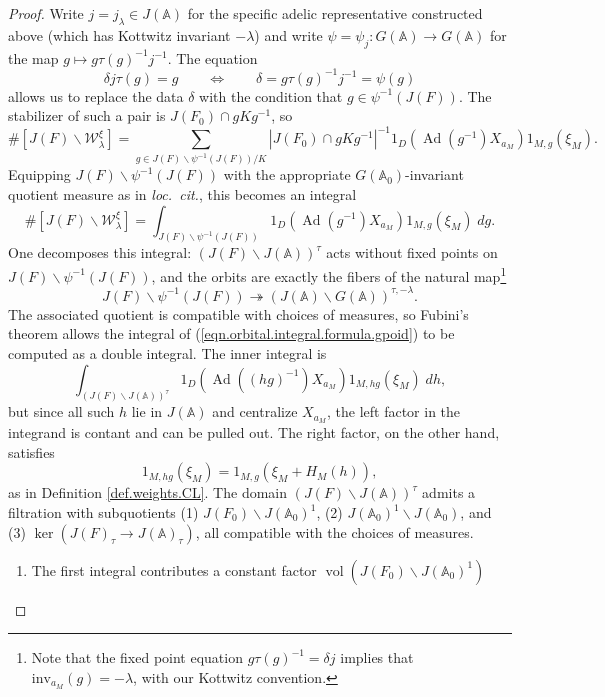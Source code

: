 \documentclass[openany]{amsbook}
\theoremstyle{definition}
\theoremstyle{remark}
\numberwithin{equation}{section}
\newcommand{\A}{\mathbb{A}}
\newcommand{\vol}{\operatorname{vol}}
\renewcommand{\-}{\operatorname{-}}
\newcommand{\on}[1]{\operatorname{#1}}
\renewcommand{\A}{\mathbb{A}}
\newcommand{\Ad}{\on{Ad}}
\newcommand{\inv}{\mathrm{inv}}
\begin{document}
\begin{proof}
    Write $j = j_\lambda \in J(\A)$ for the specific adelic representative constructed above (which has Kottwitz invariant $-\lambda$) and write $\psi = \psi_j: G(\A) \to G(\A)$ for the map $g \mapsto g \tau(g)^{-1} j^{-1}$. The equation 
    $$
        \delta j \tau(g) = g \qquad \Longleftrightarrow \qquad \delta = g \tau(g)^{-1} j^{-1} = \psi(g)
    $$
    allows us to replace the data $\delta$ with the condition that $g \in \psi^{-1}(J(F))$. The stabilizer of such a pair is $J(F_0) \cap g K g^{-1}$, so 
    $$
        \# [J(F) \backslash \mathcal{W}^\xi_\lambda] = \sum_{g \in J(F) \backslash \psi^{-1}(J(F)) / K} |J(F_0) \cap g K g^{-1}|^{-1} 1_D(\Ad(g^{-1}) X_{a_M}) 1_{M,g}(\xi_M).
    $$
    Equipping $J(F)\backslash \psi^{-1}(J(F))$ with the appropriate $G(\A_0)$-invariant quotient measure as in \textit{loc.\ cit.}, this becomes an integral
    \begin{equation}\label{eqn.orbital.integral.formula.gpoid}
        \# [J(F) \backslash \mathcal{W}^\xi_\lambda] = \int_{J(F) \backslash \psi^{-1}(J(F))} 1_D(\Ad(g^{-1}) X_{a_M}) 1_{M,g}(\xi_M) \; dg.
    \end{equation}
    One decomposes this integral: $(J(F) \backslash J(\A))^\tau$ acts without fixed points on $J(F) \backslash \psi^{-1}(J(F))$, and the orbits are exactly the fibers of the natural map\footnote{Note that the fixed point equation $g \tau(g)^{-1} = \delta j$ implies that $\inv_{a_M}(g) = -\lambda$, with our Kottwitz convention.}
    $$
        J(F) \backslash \psi^{-1}(J(F)) \twoheadrightarrow (J(\A) \backslash G(\A))^{\tau, -\lambda}.
    $$
    The associated quotient is compatible with choices of measures, so Fubini's theorem allows the integral of (\ref{eqn.orbital.integral.formula.gpoid}) to be computed as a double integral. The inner integral is
    $$
        \int_{(J(F) \backslash J(\A))^\tau} 1_D(\Ad((hg)^{-1}) X_{a_M}) 1_{M,hg}(\xi_M) \; dh,
    $$
    but since all such $h$ lie in $J(\A)$ and centralize $X_{a_M}$, the left factor in the integrand is contant and can be pulled out. The right factor, on the other hand, satisfies
    $$
        1_{M,hg}(\xi_M) = 1_{M,g}(\xi_M + H_M(h)),
    $$
    as in Definition \ref{def.weights.CL}. The domain $(J(F) \backslash J(\A))^\tau$ admits a filtration with subquotients (1) $J(F_0) \backslash J(\A_0)^1$, (2) $J(\A_0)^1 \backslash J(\A_0)$, and (3) $\ker(J(F)_\tau \to J(\A)_\tau)$, all compatible with the choices of measures. 
    \begin{enumerate} \item The first integral contributes a constant factor $\vol(J(F_0) \backslash J(\A_0)^1)$

\end{enumerate}
\end{proof}
\end{document}
